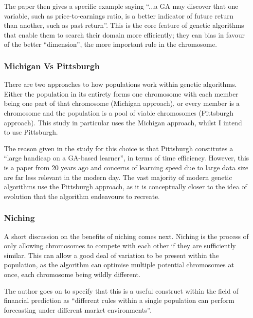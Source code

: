 The paper then gives a specific example saying ``...a GA may discover that one variable, such as price-to-earnings ratio, is a better indicator of future return than another, such as past return''. This is the core feature of genetic algorithms that enable them to search their domain more efficiently; they can bias in favour of the better ``dimension'', the more important rule in the chromosome.

\subsubsection{Michigan Vs Pittsburgh}

There are two approaches to how populations work within genetic algorithms. Either the population in its entirety forms one chromosome with each member being one part of that chromosome (Michigan approach), or every member is a chromosome and the population is a pool of viable chromosomes (Pittsburgh approach). This study in particular uses the Michigan approach, whilst I intend to use Pittsburgh. \newline

The reason given in the study for this choice is that Pittsburgh constitutes a ``large handicap on a GA-based learner'', in terms of time efficiency. However, this is a paper from 20 years ago and concerns of learning speed due to large data size are far less relevant in the modern day. The vast majority of modern genetic algorithms use the Pittsburgh approach, as it is conceptually closer to the idea of evolution that the algorithm endeavours to recreate.

\subsubsection{Niching}

A short discussion on the benefits of niching comes next. Niching is the process of only allowing chromosomes to compete with each other if they are sufficiently similar. This can allow a good deal of variation to be present within the population, as the algorithm can optimise multiple potential chromosomes at once, each chromosome being wildly different. \newline

The author goes on to specify that this is a useful construct within the field of financial prediction as ``different rules within a single population can perform forecasting under different market environments''.

